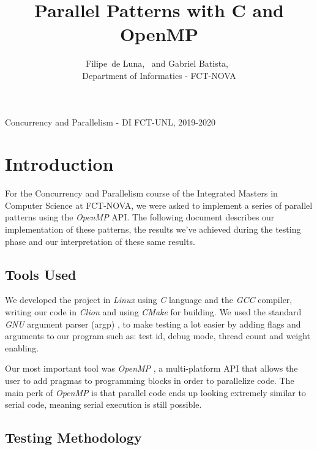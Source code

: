 \documentclass[10pt,journal]{IEEEtran}
\begin{document}

\title{Parallel Patterns with C and OpenMP}


\author{
	{
		Filipe~de Luna,~ and
        Gabriel Batista,~
    } \\ Department of Informatics - FCT-NOVA
        
}

%
{Concurrency and Parallelism - DI FCT-UNL, 2019-2020}

\maketitle

\section{Introduction}
For the Concurrency and Parallelism course of the Integrated Masters in Computer Science at FCT-NOVA, we were asked to implement a series of parallel patterns using the \textit{OpenMP} API. The following document describes our implementation of these patterns, the results we’ve achieved during the testing phase and our interpretation of these same results.

\subsection{Tools Used}

We developed the project in \textit{Linux} using \textit{C} language and the \textit{GCC} compiler, writing our code in \textit{Clion} and using \textit{CMake} for building. We used the standard \textit{GNU} argument parser (argp) \cite{argp}, to make testing a lot easier by adding flags and arguments to our program such as: test id, debug mode, thread count and weight enabling.

Our most important tool was \textit{OpenMP} \cite{omp}, a multi-platform API that allows the user to add pragmas to programming blocks in order to parallelize code. The main perk of \textit{OpenMP} is that parallel code ends up looking extremely similar to serial code, meaning serial execution is still possible.

\subsection{Testing Methodology}
\end{document}
